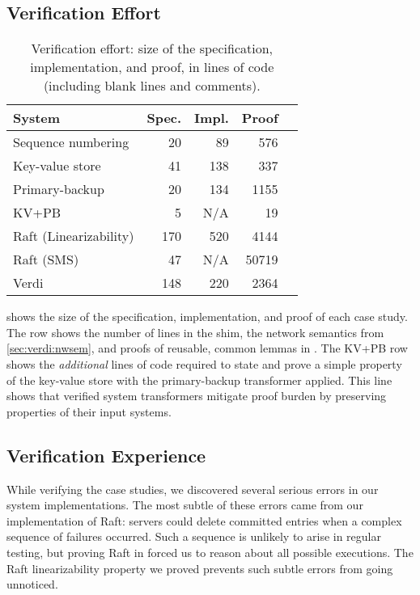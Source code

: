 \subsection{Verification Effort}
\begin{table}[t]
  \centering
  \caption{Verification effort:  size of the specification, implementation,
    and proof, in lines of code (including blank lines and comments).}\vspace{6pt}
\label{tab:effort}
  \begin{tabular}{lrrrr}
\toprule
\textbf{System}        & \textbf{Spec.} & \textbf{Impl.} & \textbf{Proof}\\\midrule
Sequence numbering     &  20            & 89             & 576       \\
Key-value store        &  41            & 138            & 337       \\
Primary-backup         &  20            & 134            & 1155      \\
KV+PB                  &  5             & N/A            & 19        \\
Raft (Linearizability) &  170           & 520            & 4144      \\
Raft (SMS)             &  47            & N/A            & 50719     \\
Verdi                  &  148           & 220            & 2364      \\
\bottomrule
  \end{tabular}
\end{table}

 shows the size of the
specification, implementation, and proof of each case study.
The \Verdi row shows
the number of lines in the shim,
the network semantics from \cref{sec:verdi:nwsem},
and proofs of reusable, common lemmas in \Verdi. The KV+PB row shows
the \textit{additional} lines of code required to state and prove a
simple property of the key-value store with the primary-backup
transformer applied. This line shows that verified system transformers
mitigate proof burden by preserving properties of their input systems.

\subsection{Verification Experience}

While verifying the case studies, we discovered several serious errors in
our system implementations.  The most subtle of these errors came from our
implementation of Raft: servers could delete committed entries when a
complex sequence of failures occurred. Such a sequence is unlikely to arise
in regular testing, but proving Raft in \Verdi forced us to reason about
all possible executions. The Raft linearizability property we proved
prevents such subtle errors from going unnoticed.

